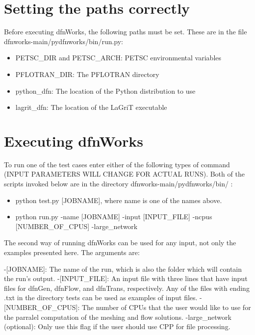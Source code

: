 \documentclass[letterpaper,10pt,english]{sphinxmanual}
\begin{document}
\section{Setting the paths correctly}
\label{examples:setting-the-paths-correctly}
Before executing dfnWorks, the following paths must be set. These are in the file dfnworks-main/pydfnworks/bin/run.py:
\begin{itemize}
\item {} 
PETSC\_DIR and PETSC\_ARCH: PETSC environmental variables

\item {} 
PFLOTRAN\_DIR: The PFLOTRAN directory

\item {} 
python\_dfn: The location of the Python distribution to use

\item {} 
lagrit\_dfn: The location of the LaGriT executable

\end{itemize}


\section{Executing dfnWorks}
\label{examples:executing-dfnworks}
To run one of the test cases enter either of the following types of command (INPUT PARAMETERS WILL CHANGE FOR ACTUAL RUNS). Both of the scripts invoked below are in the directory dfnworks-main/pydfnworks/bin/ :
\begin{itemize}
\item {} 
python test.py {[}JOBNAME{]}, where name is one of the names above.

\item {} 
python run.py -name {[}JOBNAME{]} -input {[}INPUT\_FILE{]} -ncpus {[}NUMBER\_OF\_CPUS{]} -large\_network

\end{itemize}

The second way of running dfnWorks can be used for any input, not only the examples presented here. The arguments are:

-{[}JOBNAME{]}: The name of the run, which is also the folder which will contain the run's output.
-{[}INPUT\_FILE{]}: An input file with three lines that have input files for dfnGen, dfnFlow, and dfnTrans, respectively. Any of the files with ending .txt in the directory tests can be used as examples of input files.
-{[}NUMBER\_OF\_CPUS{]}: The number of CPUs that the user would like to use for the parralel computation of the meshing and flow solutions.
-large\_network (optional): Only use this flag if the user should use CPP for file processing.
\end{document}
